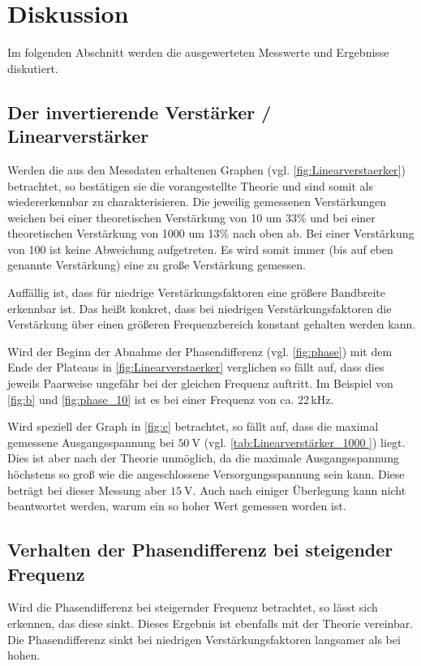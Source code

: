 \newpage
\section{Diskussion}
Im folgenden Abschnitt werden die ausgewerteten Messwerte und Ergebnisse diskutiert.

\subsection{Der invertierende Verstärker / Linearverstärker}
Werden die aus den Messdaten erhaltenen Graphen (vgl. \autoref{fig:Linearverstaerker})
betrachtet, so bestätigen sie die vorangestellte Theorie und sind somit als 
wiedererkennbar zu charakterisieren. 
Die jeweilig gemessenen Verstärkungen weichen bei einer theoretischen Verstärkung von 10 um 33\%
und bei einer theoretischen Verstärkung von 1000 um 13\% nach oben ab.
Bei einer Verstärkung von 100 ist keine Abweichung aufgetreten.
Es wird somit immer (bis auf eben genannte Verstärkung) eine zu große Verstärkung gemessen.

Auffällig ist, dass für niedrige Verstärkungsfaktoren eine größere Bandbreite erkennbar ist.
Das heißt konkret, dass bei niedrigen Verstärkungsfaktoren die Verstärkung über einen
größeren Frequenzbereich konstant gehalten werden kann.

Wird der Beginn der Abnahme der Phasendifferenz (vgl. \autoref{fig:phase}) mit dem Ende der Plateaus
in \autoref{fig:Linearverstaerker} verglichen so fällt auf, dass dies jeweils Paarweise
ungefähr bei der gleichen Frequenz auftritt. 
Im Beispiel von \autoref{fig:b} und \autoref{fig:phase_10} ist es bei einer Frequenz von ca. 22\,kHz.

Wird speziell der Graph in \autoref{fig:c} betrachtet, so fällt auf, dass die 
maximal gemessene Ausgangsspannung bei $\SI{50}{\volt}$ (vgl. \autoref{tab:Linearverstärker_1000 }) liegt. 
Dies ist aber nach der Theorie unmöglich, da die maximale Ausgangsspannung höchstens so groß wie 
die angeschlossene Versorgungsspannung sein kann. 
Diese beträgt bei dieser Messung aber $\SI{15}{\volt}$. 
Auch nach einiger Überlegung kann nicht beantwortet werden, warum ein so hoher Wert gemessen worden ist.

\subsection{Verhalten der Phasendifferenz bei steigender Frequenz}
Wird die Phasendifferenz bei steigernder Frequenz betrachtet, so lässt sich erkennen, das diese sinkt. 
Dieses Ergebnis ist ebenfalls mit der Theorie vereinbar.
Die Phasendifferenz sinkt bei niedrigen Verstärkungsfaktoren langsamer als bei hohen.

